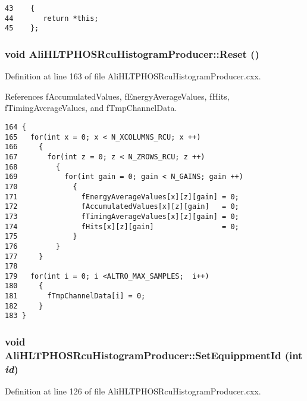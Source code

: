 \footnotesize\begin{verbatim}43    {
44       return *this;
45    };
\end{verbatim}\normalsize 


\subsubsection{\setlength{\rightskip}{0pt plus 5cm}void Ali\-HLTPHOSRcu\-Histogram\-Producer::Reset ()}\label{classAliHLTPHOSRcuHistogramProducer_a13}




Definition at line 163 of file Ali\-HLTPHOSRcu\-Histogram\-Producer.cxx.

References f\-Accumulated\-Values, f\-Energy\-Average\-Values, f\-Hits, f\-Timing\-Average\-Values, and f\-Tmp\-Channel\-Data.

\footnotesize\begin{verbatim}164 {
165   for(int x = 0; x < N_XCOLUMNS_RCU; x ++)
166     {
167       for(int z = 0; z < N_ZROWS_RCU; z ++)
168         {
169           for(int gain = 0; gain < N_GAINS; gain ++)
170             {
171               fEnergyAverageValues[x][z][gain] = 0; 
172               fAccumulatedValues[x][z][gain]   = 0;
173               fTimingAverageValues[x][z][gain] = 0; 
174               fHits[x][z][gain]                = 0;
175             }
176         } 
177     }
178   
179   for(int i = 0; i <ALTRO_MAX_SAMPLES;  i++)
180     {
181       fTmpChannelData[i] = 0;
182     }
183 }
\end{verbatim}\normalsize 


\subsubsection{\setlength{\rightskip}{0pt plus 5cm}void Ali\-HLTPHOSRcu\-Histogram\-Producer::Set\-Equippment\-Id (int {\em id})}\label{classAliHLTPHOSRcuHistogramProducer_a7}




Definition at line 126 of file Ali\-HLTPHOSRcu\-Histogram\-Producer.cxx.

